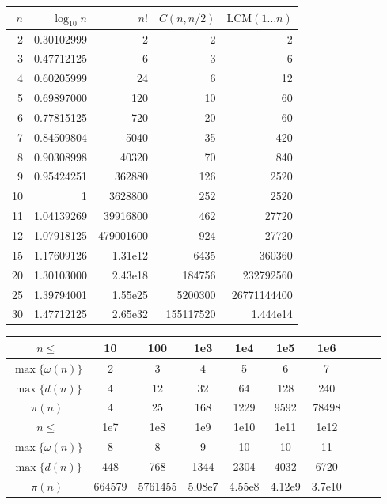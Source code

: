 \begin{table}[H]
	\centering
	\small
	\renewcommand\arraystretch{0.8}
	\begin{tabular}{|r|r|r|r|r|}
		\hline
		\rowcolor{black!10} $n$ & $\log_{10} n$ & $n!$ & $C(n,n/2)$ & $\mathrm{LCM}(1\dots n)$\\
		\hline
		2 & 0.30102999 & 2 & 2 & 2\\
		\hline
		3 & 0.47712125 & 6 & 3 & 6\\
		\hline
		4 & 0.60205999 & 24 & 6 & 12\\
		\hline
		5 & 0.69897000 & 120 & 10 & 60 \\
		\hline
		6 & 0.77815125 & 720 & 20 & 60 \\
		\hline
		7 & 0.84509804 & 5040 & 35 & 420 \\
		\hline
		8 & 0.90308998 & 40320 & 70 & 840\\
		\hline
		9 & 0.95424251 & 362880 & 126 & 2520\\
		\hline
		10 & 1 & 3628800 & 252  & 2520\\
		\hline
		11 & 1.04139269 & 39916800 & 462  & 27720 \\
		\hline
		12 & 1.07918125 & 479001600 & 924 & 27720\\
		\hline
		15 & 1.17609126 & 1.31e{12} & 6435 & 360360\\
		\hline
		20 & 1.30103000 & 2.43e{18} & 184756 & 232792560\\
		\hline
		25 & 1.39794001 & 1.55e{25} & 5200300 & 26771144400 \\
		\hline
		30 & 1.47712125 & 2.65e{32} & 155117520 & 1.444e{14}\\
		\hline
		\end{tabular}
		\begin{tabular}{|c|c|c|c|c|c|c|c|c|c|}
			\hline
			\rowcolor{black!10} $n \leq$ & 10 &  100 & 1e3 & 1e4 & 1e5 & 1e6 \\
			\hline
			$\max\{\omega(n)\}$ & 2 & 3 & 4 & 5 & 6 & 7  \\
			\hline
			$\max\{d(n)\}$ & 4 & 12 & 32 & 64 & 128 & 240 \\
			\hline
			$\pi(n)$ & 4 & 25 & 168 & 1229 & 9592 & 78498 \\
			\hline
			\rowcolor{black!10} $n \leq$ & 1e7 & 1e8 & 1e9 & 1e10 & 1e11& 1e12\\
			\hline
			$\max\{\omega(n)\}$ & 8 & 8 & 9 & 10& 10 & 11 \\
			\hline
			$\max\{d(n)\}$ & 448 & 768 & 1344 & 2304 & 4032 & 6720 \\
			\hline
			$\pi(n)$ & 664579 & 5761455 & 5.08e7 & 4.55e8 & 4.12e9 & 3.7e10 \\

\end{tabular}
\end{table}
